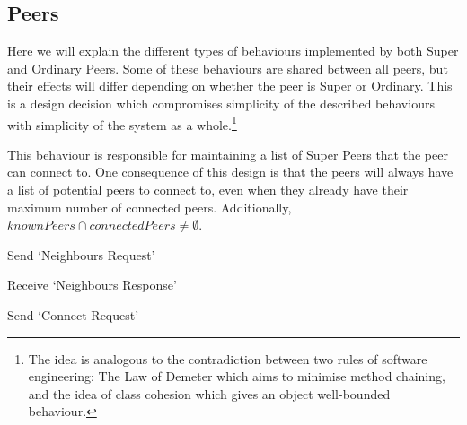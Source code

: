 \subsection{Peers}

Here we will explain the different types of behaviours implemented by both Super
and Ordinary Peers. Some of these behaviours are shared between all peers, but
their effects will differ depending on whether the peer is Super or Ordinary.
This is a design decision which compromises simplicity of the described
behaviours with simplicity of the system as a whole.\footnote{The idea is
analogous to the contradiction between two rules of software engineering: The
Law of Demeter which aims to minimise method chaining, and the idea of class
cohesion which gives an object well-bounded behaviour.}

This behaviour is responsible for maintaining a list of Super Peers that the
peer can connect to.  One consequence of this design is that the peers will
always have a list of potential peers to connect to, even when they already have
their maximum number of connected peers. Additionally, $knownPeers \cap
connectedPeers \neq \emptyset$.

\begin{algorithm}[H]
\caption{Send `Neighbours Request'}
\end{algorithm}

\begin{algorithm}[H]
\caption{Receive `Neighbours Response'}
\end{algorithm}

\begin{algorithm}[H]
\caption{Send `Connect Request'}
\end{algorithm}









